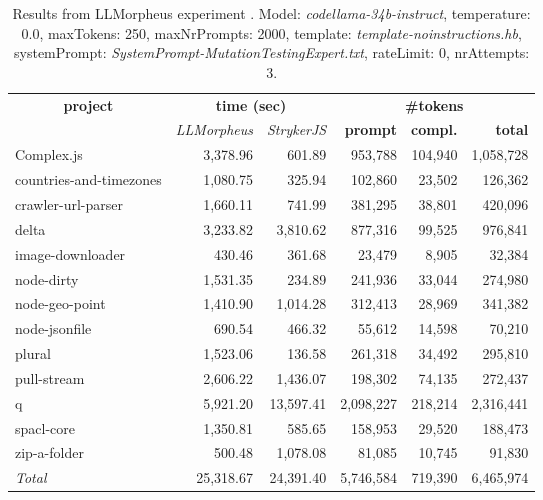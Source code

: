 
\begin{table*}[hbt!]
\centering
{\scriptsize
\begin{tabular}{l||r|r|r|r|r}
\multicolumn{1}{c|}{\bf project} & \multicolumn{2}{|c|}{\bf time (sec)} & \multicolumn{3}{|c|}{\bf \#tokens} \\
               & {\it LLMorpheus} & {\it StrykerJS} & {\bf prompt} & {\bf compl.} & {\bf total} \\
\hline
  Complex.js & 3,378.96 & 601.89 & 953,788 & 104,940 & 1,058,728 \\ 
countries-and-timezones & 1,080.75 & 325.94 & 102,860 & 23,502 & 126,362 \\ 
crawler-url-parser & 1,660.11 & 741.99 & 381,295 & 38,801 & 420,096 \\ 
delta & 3,233.82 & 3,810.62 & 877,316 & 99,525 & 976,841 \\ 
image-downloader & 430.46 & 361.68 & 23,479 & 8,905 & 32,384 \\ 
node-dirty & 1,531.35 & 234.89 & 241,936 & 33,044 & 274,980 \\ 
node-geo-point & 1,410.90 & 1,014.28 & 312,413 & 28,969 & 341,382 \\ 
node-jsonfile & 690.54 & 466.32 & 55,612 & 14,598 & 70,210 \\ 
plural & 1,523.06 & 136.58 & 261,318 & 34,492 & 295,810 \\ 
pull-stream & 2,606.22 & 1,436.07 & 198,302 & 74,135 & 272,437 \\ 
q & 5,921.20 & 13,597.41 & 2,098,227 & 218,214 & 2,316,441 \\ 
spacl-core & 1,350.81 & 585.65 & 158,953 & 29,520 & 188,473 \\ 
zip-a-folder & 500.48 & 1,078.08 & 81,085 & 10,745 & 91,830 \\ 
\hline
  \textit{Total} & 25,318.67 & 24,391.40 & 5,746,584 & 719,390 & 6,465,974 \\
  \end{tabular}
  }
  \\[2mm]
  \caption{Results from LLMorpheus experiment .
    Model: \textit{codellama-34b-instruct}, 
    temperature: 0.0, 
    maxTokens: 250, 
    maxNrPrompts: 2000, 
    template: \textit{template-noinstructions.hb}, 
    systemPrompt: \textit{SystemPrompt-MutationTestingExpert.txt}, 
    rateLimit: 0, 
    nrAttempts: 3.  
  }
  \label{table:Cost:run382:codellama-34b-instruct:template-noinstructions.hb:0.0}
\end{table*}